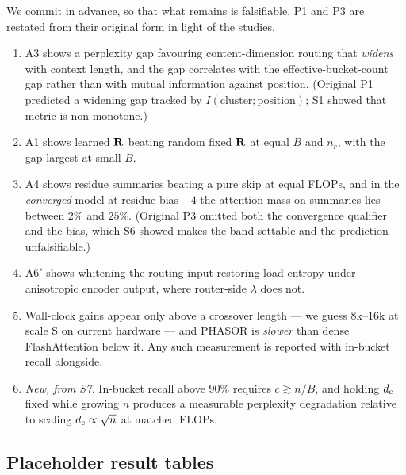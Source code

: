 We commit in advance, so that what remains is falsifiable. P1 and P3 are restated from their original form in light of the studies.

\begin{enumerate}
\item[P1$'$.] A3 shows a perplexity gap favouring content-dimension routing that \emph{widens} with context length, and the gap correlates with the effective-bucket-count gap rather than with mutual information against position. (Original P1 predicted a widening gap tracked by $I(\text{cluster};\text{position})$; S1 showed that metric is non-monotone.)
\item[P2.] A1 shows learned $\mathbf{R}$ beating random fixed $\mathbf{R}$ at equal $B$ and $n_r$, with the gap largest at small $B$.
\item[P3$'$.] A4 shows residue summaries beating a pure skip at equal FLOPs, and in the \emph{converged} model at residue bias $-4$ the attention mass on summaries lies between $2\%$ and $25\%$. (Original P3 omitted both the convergence qualifier and the bias, which S6 showed makes the band settable and the prediction unfalsifiable.)
\item[P4.] A6$'$ shows whitening the routing input restoring load entropy under anisotropic encoder output, where router-side $\lambda$ does not.
\item[P5.] Wall-clock gains appear only above a crossover length --- we guess 8k--16k at scale S on current hardware --- and PHASOR is \emph{slower} than dense FlashAttention below it. Any such measurement is reported with in-bucket recall alongside.
\item[P6.] \emph{New, from S7.} In-bucket recall above $90\%$ requires $c \gtrsim n/B$, and holding $d_{\mathrm{c}}$ fixed while growing $n$ produces a measurable perplexity degradation relative to scaling $d_{\mathrm{c}} \propto \sqrt{n}$ at matched FLOPs.
\end{enumerate}

\subsection{Placeholder result tables}
\label{sec:placeholders}

